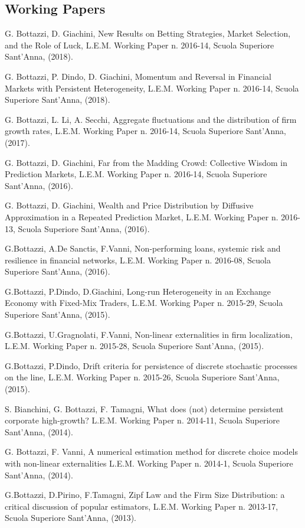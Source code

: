 \documentclass[a4paper]{article}
\begin{document}
\subsection{Working Papers%
  \label{working-papers}%
}

G. Bottazzi, D. Giachini, New Results on Betting Strategies, Market
Selection, and the Role of Luck, L.E.M.  Working Paper n. 2016-14,
Scuola Superiore Sant'Anna, (2018).

G. Bottazzi, P. Dindo, D. Giachini, Momentum and Reversal in Financial
Markets with Persistent Heterogeneity, L.E.M.  Working
Paper n. 2016-14, Scuola Superiore Sant'Anna, (2018).

G. Bottazzi, L. Li, A. Secchi, Aggregate fluctuations and the
distribution of firm growth rates, L.E.M.  Working Paper n. 2016-14,
Scuola Superiore Sant'Anna, (2017).

G. Bottazzi, D. Giachini, Far from the Madding Crowd: Collective
Wisdom in Prediction Markets, L.E.M.  Working Paper n. 2016-14, Scuola
Superiore Sant'Anna, (2016).

G. Bottazzi, D. Giachini, Wealth and Price Distribution by Diffusive
Approximation in a Repeated Prediction Market, L.E.M.  Working
Paper n. 2016-13, Scuola Superiore Sant'Anna, (2016).

G.Bottazzi, A.De Sanctis, F.Vanni, Non-performing loans, systemic risk
and resilience in financial networks, L.E.M.  Working
Paper n. 2016-08, Scuola Superiore Sant'Anna, (2016).

G.Bottazzi, P.Dindo, D.Giachini, Long-run Heterogeneity in an Exchange
Economy with Fixed-Mix Traders, L.E.M.  Working Paper n. 2015-29,
Scuola Superiore Sant'Anna, (2015).

G.Bottazzi, U.Gragnolati, F.Vanni, Non-linear externalities in firm
localization, L.E.M.  Working Paper n. 2015-28, Scuola Superiore
Sant'Anna, (2015).

G.Bottazzi, P.Dindo, Drift criteria for persistence of discrete
stochastic processes on the line, L.E.M.  Working Paper n. 2015-26,
Scuola Superiore Sant'Anna, (2015).

S. Bianchini, G. Bottazzi, F. Tamagni, What does (not) determine
persistent corporate high-growth? L.E.M.  Working Paper n. 2014-11,
Scuola Superiore Sant'Anna, (2014).

G. Bottazzi, F. Vanni, A numerical estimation method for discrete
choice models with non-linear externalities L.E.M.  Working
Paper n. 2014-1, Scuola Superiore Sant'Anna, (2014).

G.Bottazzi, D.Pirino, F.Tamagni, Zipf Law and the Firm Size
Distribution: a critical discussion of popular estimators, L.E.M.
Working Paper n. 2013-17, Scuola Superiore Sant'Anna, (2013).
\end{document}
